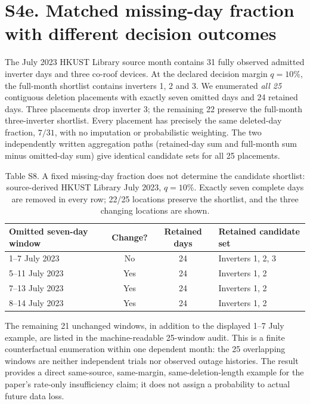 \documentclass[11pt]{article}
\begin{document}
\section*{S4e. Matched missing-day fraction with different decision outcomes}

The July 2023 HKUST Library source month contains 31 fully observed admitted inverter days and three co-roof devices. At the declared decision margin $q=10\%$, the full-month shortlist contains inverters 1, 2 and 3. We enumerated \emph{all 25} contiguous deletion placements with exactly seven omitted days and 24 retained days. Three placements drop inverter 3; the remaining 22 preserve the full-month three-inverter shortlist. Every placement has precisely the same deleted-day fraction, $7/31$, with no imputation or probabilistic weighting. The two independently written aggregation paths (retained-day sum and full-month sum minus omitted-day sum) give identical candidate sets for all 25 placements.

\begin{table}[ht]
\centering
\caption*{Table S8. A fixed missing-day fraction does not determine the candidate shortlist: source-derived HKUST Library July 2023, $q=10\%$. Exactly seven complete days are removed in every row; 22/25 locations preserve the shortlist, and the three changing locations are shown.}
\small
\begin{tabular}{lccp{5.5cm}}
\toprule
Omitted seven-day window & Change? & Retained days & Retained candidate set \\
\midrule
1--7 July 2023 & No & 24 & Inverters 1, 2, 3 \\
5--11 July 2023 & Yes & 24 & Inverters 1, 2 \\
7--13 July 2023 & Yes & 24 & Inverters 1, 2 \\
8--14 July 2023 & Yes & 24 & Inverters 1, 2 \\
\bottomrule
\end{tabular}
\end{table}

The remaining 21 unchanged windows, in addition to the displayed 1--7 July example, are listed in the machine-readable 25-window audit. This is a finite counterfactual enumeration within one dependent month: the 25 overlapping windows are neither independent trials nor observed outage histories. The result provides a direct same-source, same-margin, same-deletion-length example for the paper's rate-only insufficiency claim; it does not assign a probability to actual future data loss.
\end{document}
